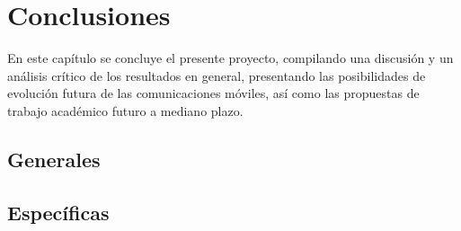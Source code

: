 
\chapter{Conclusiones} %

\label{Chapter8} %

En este capítulo se concluye el presente proyecto, compilando una discusión y un análisis crítico de los resultados en general, presentando las posibilidades de evolución futura de las comunicaciones móviles, así como las propuestas de trabajo académico futuro a mediano plazo.


\section{Generales}


\section{Específicas}

